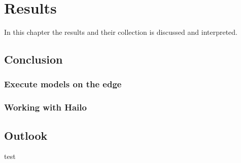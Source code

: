 \chapter{Results}
In this chapter the results and their collection is discussed and interpreted.





\section{Conclusion}

\subsection{Execute models on the edge}

\subsection{Working with Hailo}

\section{Outlook}
test